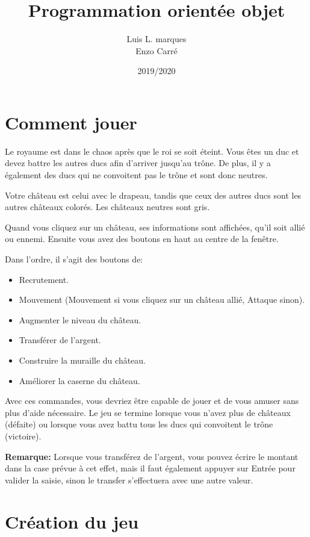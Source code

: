 \documentclass[12pt, a4paper]{report}
\title{Programmation orientée objet}
\author{Luis L. marques\\Enzo Carré}
\date{2019/2020}
\begin{document}
\maketitle
\tableofcontents

\newpage
\section*{Comment jouer}

Le royaume est dans le chaos après que le roi se soit éteint. Vous êtes un duc et devez battre les autres ducs afin d'arriver jusqu'au trône. De plus, il y a également des ducs qui ne convoitent pas le trône et sont donc neutres.

Votre château est celui avec le drapeau, tandis que ceux des autres ducs sont les autres châteaux colorés. Les châteaux neutres sont gris.


Quand vous cliquez sur un château, ses informations sont affichées, qu'il soit allié ou ennemi. Ensuite vous avez des boutons en haut au centre de la fenêtre.

Dans l'ordre, il s'agit des boutons de:

\begin{itemize}
    \item Recrutement.
    \item Mouvement (Mouvement si vous cliquez sur un château allié, Attaque sinon).
    \item Augmenter le niveau du château.
    \item Transférer de l'argent.
    \item Construire la muraille du château.
    \item Améliorer la caserne du château.
\end{itemize}

Avec ces commandes, vous devriez être capable de jouer et de vous amuser sans plus d'aide nécessaire. Le jeu se termine lorsque vous n'avez plus de châteaux (défaite) ou lorsque vous avez battu tous les ducs qui convoitent le trône (victoire).

\textbf{Remarque:} Lorsque vous transférez de l'argent, vous pouvez écrire le montant dans la case prévue à cet effet, mais il faut également appuyer sur Entrée pour valider la saisie, sinon le transfer s'effectuera avec une autre valeur.

\section*{Création du jeu}
\end{document}
